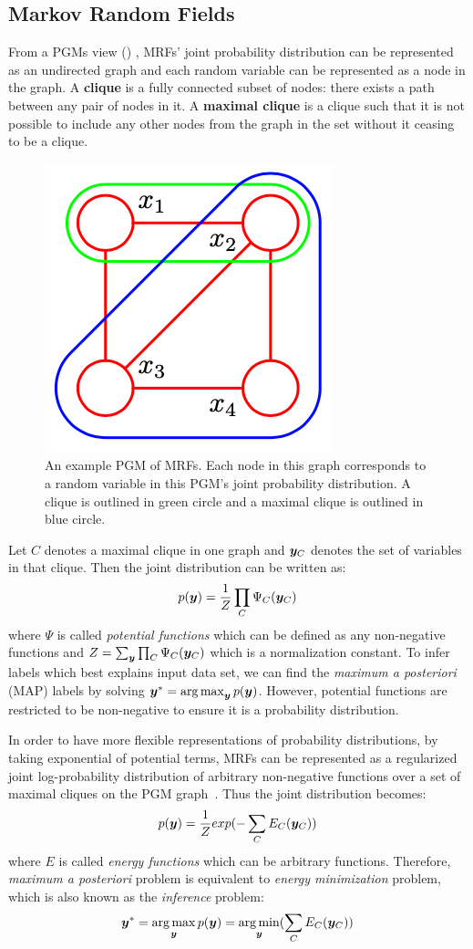 \subsection{Markov Random Fields}
\label{sec:MRF}
From a PGMs view () \cite{Bishop:2007},
MRFs' joint probability distribution can be represented as an
undirected graph and each random variable can be represented as a
node in the graph. A \textbf{clique} is a fully connected subset
of nodes: there exists a path between any pair of nodes in it. A
\textbf{maximal clique} is a clique such that it is not possible
to include any other nodes from the graph in the set without it
ceasing to be a clique.
\begin{figure}[ht]
  \centering
  \includegraphics[width=0.3\columnwidth]{Part2/figures/prml_mrf}
  \caption{\label{fig:prml_mrf} An example PGM of MRFs. Each node
    in this graph corresponds to a random variable in this PGM's
    joint probability distribution. A clique is outlined in green
    circle and a maximal clique is outlined in blue circle.}
\end{figure}
Let $C$ denotes a maximal clique in one graph and ${\bm{y}}_C$ denotes
the set of variables in that clique. Then the joint distribution
can be written as:
\begin{align}
  p({\bm{y}})=\frac{1}{Z}\prod_{C}{\Psi_C({\bm{y}}_C)}
\end{align}
\noindent where $\Psi$ is called \emph{potential functions} which
can be defined as any non-negative functions and
$Z=\sum_{{\bm{y}}}\prod_{C}{\Psi_C({\bm{y}}_C)}$ which is a normalization
constant. To infer labels which best explains input data set, we
can find the \emph{maximum a posteriori} (MAP) labels by solving
${\bm{y}}^*=\operatorname*{arg\,max}_{{\bm{y}}}p({\bm{y}})$. However, potential functions are
restricted to be non-negative to ensure it is a probability
distribution.

In order to have more flexible representations of probability
distributions, by taking exponential of potential terms, MRFs can
be represented as a regularized joint log-probability
distribution of arbitrary non-negative functions over a set of
maximal cliques on the PGM graph~\cite{bishop:2006:PRML}. Thus
the joint distribution becomes:
\begin{align}
  p({\bm{y}})=\frac{1}{Z}exp(-\sum_{C}{E_C({\bm{y}}_C)})
\end{align}
\noindent where $E$ is called \emph{energy functions} which can be
arbitrary functions. Therefore, \emph{maximum a posteriori}
problem is equivalent to \emph{energy minimization} problem,
which is also known as the \emph{inference} problem:
\begin{align}
  {\bm{y}}^*=\operatorname*{arg\,max}_{{\bm{y}}}p({\bm{y}})=\operatorname*{arg\,min}_{{\bm{y}}}(\sum_{C}{E_C({\bm{y}}_C)})
\end{align}

